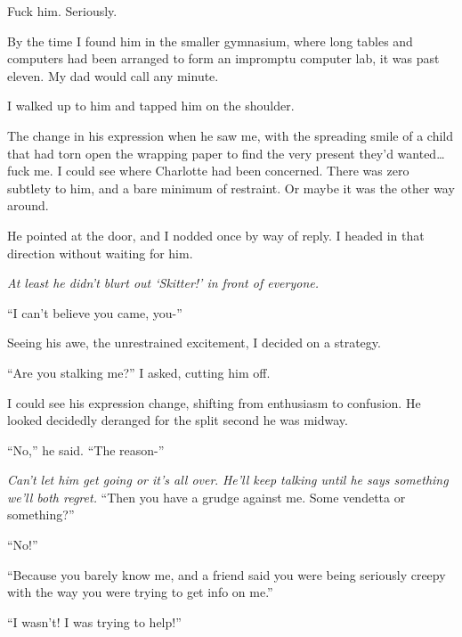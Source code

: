 Fuck him.  Seriously.



By the time I found him in the smaller gymnasium, where long tables and computers had been arranged to form an impromptu computer lab, it was past eleven.  My dad would call any minute.



I walked up to him and tapped him on the shoulder.



The change in his expression when he saw me, with the spreading smile of a child that had torn open the wrapping paper to find the very present they'd wanted\ldots fuck me.  I could see where Charlotte had been concerned.  There was zero subtlety to him, and a bare minimum of restraint.  Or maybe it was the other way around.



He pointed at the door, and I nodded once by way of reply.  I headed in that direction without waiting for him.



\emph{At least he didn't blurt out `Skitter!' in front of everyone.}



``I can't believe you came, you-''



Seeing his awe, the unrestrained excitement, I decided on a strategy.



``Are you stalking me?'' I asked, cutting him off.



I could see his expression change, shifting from enthusiasm to confusion.  He looked decidedly deranged for the split second he was midway.



``No,'' he said.  ``The reason-''



\emph{Can't let him get going or it's all over}.  \emph{He'll keep talking until he says something we'll both regret.}  ``Then you have a grudge against me.  Some vendetta or something?''



``No!''



``Because you barely know me, and a friend said you were being seriously creepy with the way you were trying to get info on me.''



``I wasn't!  I was trying to help!''



